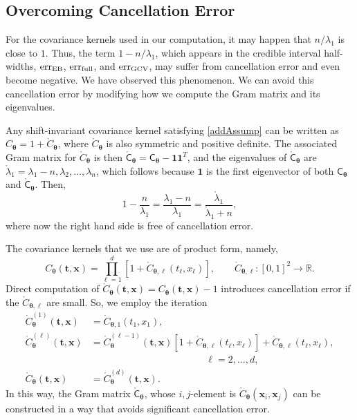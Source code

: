 \documentclass{svjour3}                     %
\newcommand{\bm}[1]{\boldsymbol{#1}}
\newcommand{\reals}{\mathbb{R}}
\newcommand{\rC}{\mathring{C}}
\newcommand{\rlambda}{\mathring{\lambda}}
\newcommand{\vtheta}{{\bm{\theta}}}
\newcommand{\vt}{\bm{t}}
\newcommand{\vx}{\bm{x}}
\newcommand{\vone}{\bm{1}}
\newcommand{\mC}{\mathsf{C}}
\newcommand{\rmC}{\mathring{\mathsf{C}}}
\newcommand{\MLE}{\textup{EB}}
\newcommand{\err}{\textup{err}}
\begin{document}
\subsection{Overcoming Cancellation Error}
For the covariance kernels used in our computation, it may happen that $n/\lambda_1$ is close to $1$.  Thus, the term $1-n/\lambda_1$, which appears in the credible interval half-widths, $\err_{\MLE}$, $\err_{\textup{full}}$, and $\err_{\textup{GCV}}$, may suffer from cancellation error and even become negative.  We have observed this phenomenon.  We can avoid this cancellation error by modifying how we compute the Gram matrix and its eigenvalues.

Any shift-invariant covariance kernel satisfying \eqref{addAssump} can be written as $C_\vtheta = 1 + \rC_\vtheta$, where $\rC_\vtheta$ is also symmetric and positive definite. The associated Gram matrix for $\rC_\vtheta$ is then $\rmC_\vtheta = \mC_\vtheta - \vone \vone^T$, and the eigenvalues of $\rmC_\vtheta$ are $\rlambda_1 = \lambda_1 - n, \lambda_2, \ldots, \lambda_n$, which follows because $\vone$ is the first eigenvector of both $\mC_\vtheta$ and $\rmC_\vtheta$. Then, 
\begin{equation*}
1 - \frac{n}{\lambda_1}  = \frac{\lambda_1 - n}{\lambda_1} = \frac{\rlambda_1}{\rlambda_1 +n},
\end{equation*}
where now the right hand side is free of cancellation error.

The covariance kernels that we use are of product form, namely,
\begin{equation*}
C_\vtheta(\vt, \vx) = \prod_{\ell=1}^d \left[1 + \rC_{\vtheta,\ell}(t_\ell,x_\ell) \right], \qquad  \rC_{\vtheta,\ell}:[0,1]^2 \to \reals.
\end{equation*}
Direct computation of $\rC_\vtheta(\vt,\vx) = C_\vtheta(\vt,\vx) -1$ introduces cancellation error if the $ \rC_{\vtheta, \ell}$ are small.  So, we employ the iteration
\begin{align*}
\rC^{(1)}_\vtheta(\vt,\vx) &= \rC_{\vtheta, 1}(t_1,x_1),  \\
\rC^{(\ell)}_\vtheta(\vt,\vx) &  = \rC^{(\ell-1)}_\vtheta(\vt,\vx) [1 + \rC_{\vtheta,\ell}(t_\ell,x_\ell)] + \rC_{\vtheta,\ell}(t_\ell,x_\ell), \\
& \hspace{5cm} \ell = 2, \ldots, d, \\
\rC_\vtheta(\vt,\vx)  & = \rC^{(d)}_\vtheta(\vt,\vx).
\end{align*}
In this way, the Gram matrix $\rmC_\vtheta$, whose $i,j$-element is $\rC_\vtheta(\vx_i,\vx_j)$ can be constructed in a way that avoids significant cancellation error.
\end{document}
